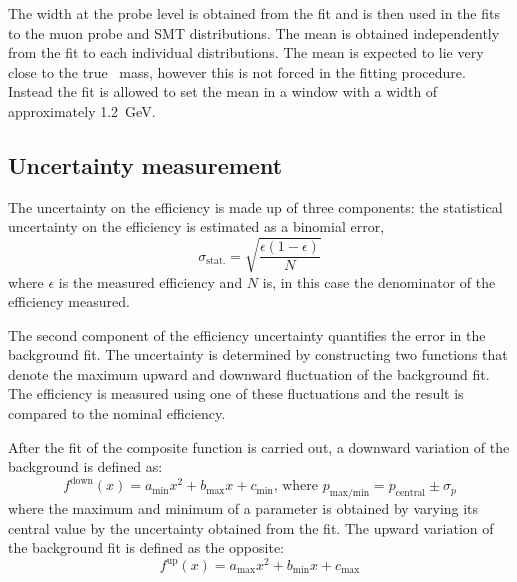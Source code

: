 The width at the probe level is obtained from the fit and is then used in the fits to the muon probe and SMT distributions. The mean is obtained independently from the fit to each individual distributions. The mean is expected to lie very close to the true \jpsi\ mass, however this is not forced in the fitting procedure. Instead the fit is allowed to set the mean in a window with a width of approximately \SI{1.2}{\GeV}. 

\subsection{Uncertainty measurement} \label{sec:CalibrationUncertainty}

The uncertainty on the efficiency is made up of three components: the statistical uncertainty on the efficiency is estimated as a binomial error,
%
\begin{equation}
  \sigma_{\textrm{stat.}} = \sqrt{\frac{\epsilon(1-\epsilon)}{N}}
\end{equation}
%
where $\epsilon$ is the measured efficiency and $N$ is, in this case the denominator of the efficiency measured.

The second component of the efficiency uncertainty quantifies the error in the background fit. The uncertainty is determined by constructing two functions that denote the maximum upward and downward fluctuation of the background fit. The efficiency is measured using one of these fluctuations and the result is compared to the nominal efficiency.

After the fit of the composite function is carried out, a downward variation of the background is defined as:
%
\begin{equation}
  f^{\textrm{down}}(x) = a_{\textrm{min}}x^{2} + b_{\textrm{max}}x + c_{\textrm{min}}\textrm{, where }p_{\textrm{max/min}}=p_{\textrm{central}}\pm\sigma_{p}
\end{equation}
%
where the maximum and minimum of a parameter is obtained by varying its central value by the uncertainty obtained from the fit. The upward variation of the background fit is defined as the opposite:
%
\begin{equation}
  f^{\textrm{up}}(x) = a_{\textrm{max}}x^{2} + b_{\textrm{min}}x + c_{\textrm{max}}
\end{equation}

